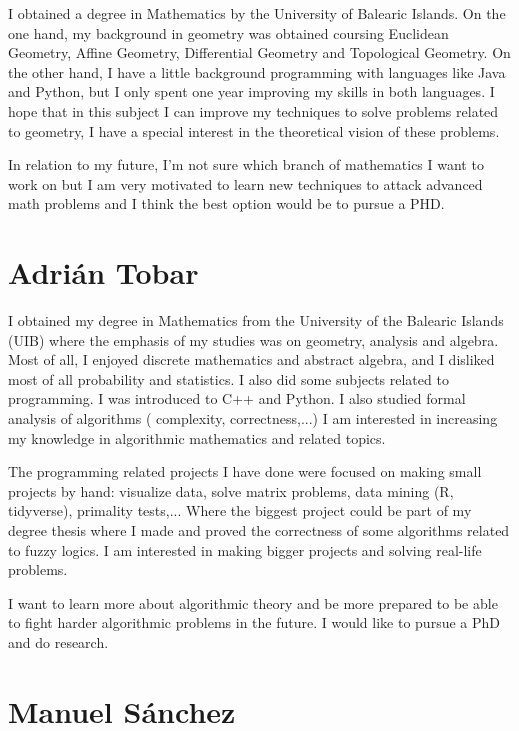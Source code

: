 \documentclass[11pt]{amsart}
\begin{document}
I obtained a degree in Mathematics by the University of Balearic Islands. On the one hand, my background in geometry was obtained coursing Euclidean Geometry, Affine Geometry, Differential Geometry and Topological Geometry.
On the other hand, I have a little background programming with languages like Java and Python, but I only spent one year improving my skills in both languages. 
I hope that in this subject I can improve my techniques to solve problems related to geometry, I have a special interest in the theoretical vision of these problems.

In relation to my future, I'm not sure which branch of mathematics I want to work on but  I am very motivated to learn new techniques to attack advanced math problems and I think the best option would be to pursue a PHD.

\section*{Adrián Tobar}


I obtained my degree in Mathematics from the University of the Balearic Islands (UIB) where the emphasis of my studies was on geometry, analysis and algebra.
Most of all, I enjoyed discrete mathematics and abstract algebra, and I disliked most of all probability and statistics.
I also did some subjects related to programming. I was introduced to C++ and Python. I also studied formal analysis of algorithms ( complexity, correctness,...)
I am interested in increasing my knowledge in algorithmic mathematics and related topics.

The programming related projects I have done were focused on making small projects by hand: visualize data, solve matrix problems, data mining (R, tidyverse),
primality tests,... Where the biggest project could be part of my degree thesis where I made and proved the correctness of some algorithms related to fuzzy logics.
I am interested in making bigger projects and solving real-life problems.

I want to learn more about algorithmic theory and be more prepared to be able to fight harder algorithmic problems in the future.  I would like to pursue a PhD and do research.



\medskip

\section*{Manuel Sánchez}
\end{document}
